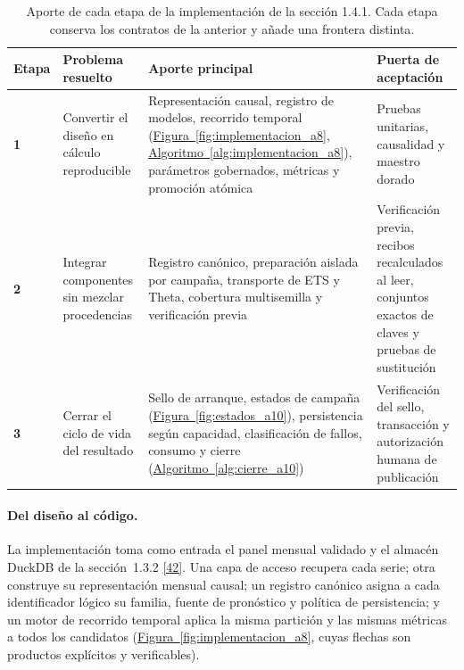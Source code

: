 \documentclass[12pt,letterpaper]{report}
\newcommand{\cita}[1]{\hyperref[bib:#1]{[#1]}}
\begin{document}
\begin{table}[htbp]
\centering
\footnotesize
\caption[Etapas de la implementación]{Aporte de cada etapa de la implementación de la
sección 1.4.1. Cada etapa conserva los contratos de la anterior y añade una frontera distinta.}
\label{tab:avances_a10}
\begin{tabular}{@{}>{\RaggedRight\arraybackslash}p{1.3cm}>{\RaggedRight\arraybackslash}p{3.3cm}>{\RaggedRight\arraybackslash}p{5.2cm}>{\RaggedRight\arraybackslash}p{3.8cm}@{}}
\toprule
\rowcolor{uacjblue!15}
\textbf{Etapa} & \textbf{Problema resuelto} & \textbf{Aporte principal} & \textbf{Puerta de aceptación} \\ \midrule
\textbf{1} & Convertir el diseño en cálculo reproducible & Representación causal, registro de modelos, recorrido temporal (\hyperref[fig:implementacion_a8]{Figura~\ref*{fig:implementacion_a8}}, \hyperref[alg:implementacion_a8]{Algoritmo~\ref*{alg:implementacion_a8}}), parámetros gobernados, métricas y promoción atómica & Pruebas unitarias, causalidad y maestro dorado \\
\textbf{2} & Integrar componentes sin mezclar procedencias & Registro canónico, preparación aislada por campaña, transporte de ETS y Theta, cobertura multisemilla y verificación previa & Verificación previa, recibos recalculados al leer, conjuntos exactos de claves y pruebas de sustitución \\
\textbf{3} & Cerrar el ciclo de vida del resultado & Sello de arranque, estados de campaña (\hyperref[fig:estados_a10]{Figura~\ref*{fig:estados_a10}}), persistencia según capacidad, clasificación de fallos, consumo y cierre (\hyperref[alg:cierre_a10]{Algoritmo~\ref*{alg:cierre_a10}}) & Verificación del sello, transacción y autorización humana de publicación \\ \bottomrule
\end{tabular}
\end{table}

\paragraph{Del diseño al código.} La implementación toma como entrada el panel mensual
validado y el almacén DuckDB de la sección~1.3.2 \cita{42}. Una capa de acceso recupera cada
serie; otra construye su representación mensual causal; un registro canónico asigna a cada
identificador lógico su familia, fuente de pronóstico y política de persistencia; y un motor de
recorrido temporal aplica la misma partición y las mismas métricas a todos los candidatos
(\hyperref[fig:implementacion_a8]{Figura~\ref*{fig:implementacion_a8}}, cuyas flechas son productos explícitos y verificables).
\end{document}
